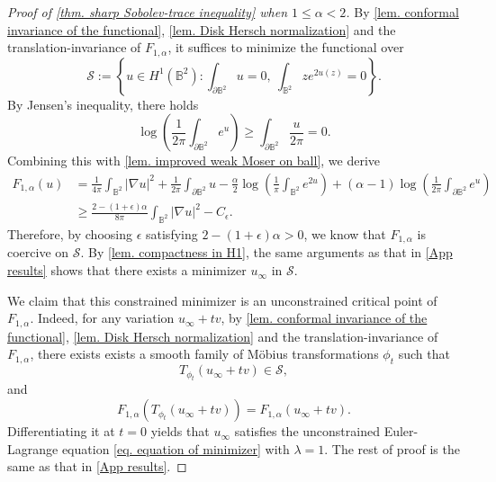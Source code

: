 \documentclass[11pt,a4paper,twoside]{amsart}
\newtheorem{sketch proof}{Sketch of the proof}[section]
\begin{document}
    \begin{proof}[Proof of \cref{thm. sharp Sobolev-trace inequality} when $1\leq \alpha<2$]
        By \cref{lem. conformal invariance of the functional}, \cref{lem. Disk Hersch normalization} and the translation-invariance of $F_{1,\alpha}$, it suffices to minimize the functional over
        \[
        \mathcal{S}:=
        \left\{u\in H^1(\mathbb{B}^2):
        \int_{\partial\mathbb{B}^2}u=0,\ 
        \int_{\mathbb{B}^2}ze^{2u(z)}=0
        \right\}.
        \]
        By Jensen's inequality, there holds
        \[
        \log\left(\frac{1}{2\pi}
        \int_{\partial\mathbb{B}^2}e^u
        \right)
        \geq \int_{\partial\mathbb{B}^2}
        \frac{u}{2\pi}
        =0.
        \]
        Combining this with \cref{lem. improved weak Moser on ball}, we derive
        \begin{align*}
            F_{1,\alpha}(u)
        &= \frac{1}{4\pi}
        \int_{\mathbb{B}^2}|\nabla u|^2
        +\frac{1}{2\pi}
        \int_{\partial \mathbb{B}^2}u
        -\frac{\alpha}{2}
        \log\left(
        \frac{1}{\pi}\int_{\mathbb{B}^2}e^{2u}
        \right)
        +(\alpha-1)
        \log\left(
        \frac{1}{2\pi}
        \int_{\partial\mathbb{B}^2}e^{u}
        \right)\\[3mm]
        & \geq \frac{2-(1+\epsilon)\alpha}{8\pi}
        \int_{\mathbb{B}^2}|\nabla u|^2
        -C_\epsilon.
        \end{align*}
        Therefore, by choosing $\epsilon$ satisfying $2-(1+\epsilon)\alpha>0$, we know that $F_{1,\alpha}$ is coercive on $\mathcal{S}$. By \cref{lem. compactness in H1}, the same arguments as that in \cref{App results} shows that there exists a minimizer $u_\infty$ in $\mathcal{S}$. 
        
        We claim that this constrained minimizer is  an unconstrained critical point of $F_{1,\alpha}$. Indeed, for any variation $u_\infty+tv$, by \cref{lem. conformal invariance of the functional}, \cref{lem. Disk Hersch normalization} and the translation-invariance of $F_{1,\alpha}$,  there exists exists a smooth family of M\"obius transformations $\phi_t$ such that 
        \[
        T_{\phi_t}(u_\infty+tv)\in\mathcal{S},
        \]
        and
        \[
        F_{1,\alpha}(T_{\phi_t}(u_\infty+tv))
        =F_{1,\alpha}(u_\infty+tv).
        \]
        Differentiating it at $t=0$ yields that $u_\infty$ satisfies the unconstrained Euler-Lagrange equation \cref{eq. equation of minimizer} with $\lambda=1$.
        The rest of proof is the same as that in \cref{App results}.
    \end{proof}
\end{document}
